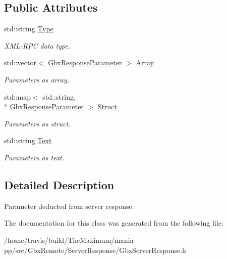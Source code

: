 \subsection*{Public Attributes}
\begin{DoxyCompactItemize}
\item 
\hypertarget{classGbxResponseParameter_aa1700ca65fa2526b112be24b5c0bdbf4}{std\-::string \hyperlink{classGbxResponseParameter_aa1700ca65fa2526b112be24b5c0bdbf4}{Type}}\label{classGbxResponseParameter_aa1700ca65fa2526b112be24b5c0bdbf4}

\begin{DoxyCompactList}\small\item\em X\-M\-L-\/\-R\-P\-C data type. \end{DoxyCompactList}\item 
\hypertarget{classGbxResponseParameter_abd56daae71edf6749b634d0545a85aad}{std\-::vector$<$ \hyperlink{classGbxResponseParameter}{Gbx\-Response\-Parameter} $>$ \hyperlink{classGbxResponseParameter_abd56daae71edf6749b634d0545a85aad}{Array}}\label{classGbxResponseParameter_abd56daae71edf6749b634d0545a85aad}

\begin{DoxyCompactList}\small\item\em Parameters as array. \end{DoxyCompactList}\item 
\hypertarget{classGbxResponseParameter_acc26f8d64983f92709d1fa38b8f33e66}{std\-::map$<$ std\-::string, \\*
\hyperlink{classGbxResponseParameter}{Gbx\-Response\-Parameter} $>$ \hyperlink{classGbxResponseParameter_acc26f8d64983f92709d1fa38b8f33e66}{Struct}}\label{classGbxResponseParameter_acc26f8d64983f92709d1fa38b8f33e66}

\begin{DoxyCompactList}\small\item\em Parameters as struct. \end{DoxyCompactList}\item 
\hypertarget{classGbxResponseParameter_a2e5cb2904900fc74a47c35c0c2fafc55}{std\-::string \hyperlink{classGbxResponseParameter_a2e5cb2904900fc74a47c35c0c2fafc55}{Text}}\label{classGbxResponseParameter_a2e5cb2904900fc74a47c35c0c2fafc55}

\begin{DoxyCompactList}\small\item\em Parameters as text. \end{DoxyCompactList}\end{DoxyCompactItemize}


\subsection{Detailed Description}
Parameter deducted from server response. 

The documentation for this class was generated from the following file\-:\begin{DoxyCompactItemize}
\item 
/home/travis/build/\-The\-Maximum/mania-\/pp/src/\-Gbx\-Remote/\-Server\-Response/Gbx\-Server\-Response.\-h\end{DoxyCompactItemize}
